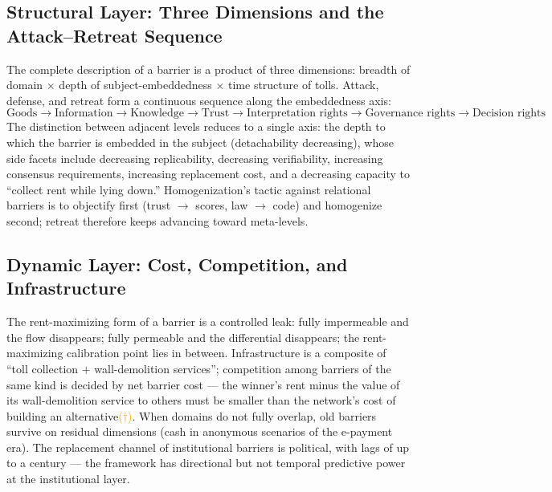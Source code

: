 \documentclass[11pt]{article}
\newcommand{\infmark}{\textcolor{orange}{(\(\dagger\))}}
\begin{document}
\subsection{Structural Layer: Three Dimensions and the Attack--Retreat Sequence}
The complete description of a barrier is a product of three dimensions: breadth of domain $\times$ depth of subject-embeddedness $\times$ time structure of tolls. Attack, defense, and retreat form a continuous sequence along the embeddedness axis:
\[
\text{Goods} \to \text{Information} \to \text{Knowledge} \to \text{Trust} \to \text{Interpretation rights} \to \text{Governance rights} \to \text{Decision rights}
\]
The distinction between adjacent levels reduces to a single axis: the depth to which the barrier is embedded in the subject (detachability decreasing), whose side facets include decreasing replicability, decreasing verifiability, increasing consensus requirements, increasing replacement cost, and a decreasing capacity to ``collect rent while lying down.'' Homogenization's tactic against relational barriers is to objectify first (trust $\to$ scores, law $\to$ code) and homogenize second; retreat therefore keeps advancing toward meta-levels.

\subsection{Dynamic Layer: Cost, Competition, and Infrastructure}
The rent-maximizing form of a barrier is a controlled leak: fully impermeable and the flow disappears; fully permeable and the differential disappears; the rent-maximizing calibration point lies in between. Infrastructure is a composite of ``toll collection $+$ wall-demolition services''; competition among barriers of the same kind is decided by net barrier cost --- the winner's rent minus the value of its wall-demolition service to others must be smaller than the network's cost of building an alternative\infmark. When domains do not fully overlap, old barriers survive on residual dimensions (cash in anonymous scenarios of the e-payment era). The replacement channel of institutional barriers is political, with lags of up to a century --- the framework has directional but not temporal predictive power at the institutional layer.
\end{document}
